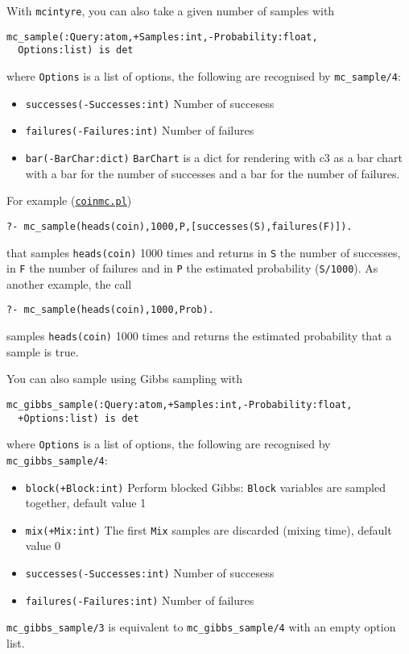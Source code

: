 With \verb|mcintyre|, you can also take a given number of samples with
\begin{verbatim}
mc_sample(:Query:atom,+Samples:int,-Probability:float,
  Options:list) is det
\end{verbatim}
where
\verb|Options| is a list of options, the following are recognised by \verb|mc_sample/4|:
\begin{itemize}
\item \verb|successes(-Successes:int)|
Number of succesess
\item \verb|failures(-Failures:int)|
Number of failures
\item \verb|bar(-BarChar:dict)|
\verb|BarChart| is a dict for rendering with c3 as a bar chart with
a bar for the number of successes and a bar for the number
of failures.
\end{itemize}
For example (\href{http://cplint.eu/example/inference/coinmc.pl}{\texttt{coinmc.pl}})
\begin{verbatim}
?- mc_sample(heads(coin),1000,P,[successes(S),failures(F)]).
\end{verbatim}
that samples \verb|heads(coin)| 1000 times and returns in \verb|S| the number of successes, in \verb|F| the number of failures and in \verb|P| the
estimated probability (\verb|S/1000|).
As another example, the call
\begin{verbatim}
?- mc_sample(heads(coin),1000,Prob).
\end{verbatim}
samples \verb|heads(coin)| 1000 times and returns the
estimated probability that a sample is true.

You can also sample using Gibbs sampling with
\begin{verbatim}
mc_gibbs_sample(:Query:atom,+Samples:int,-Probability:float,
  +Options:list) is det
\end{verbatim}
where
\verb|Options| is a list of options, the following are recognised by \verb|mc_gibbs_sample/4|:
\begin{itemize}
\item \verb|block(+Block:int)|
   Perform blocked Gibbs: \verb|Block| variables are sampled together, default value 1
\item \verb|mix(+Mix:int)|
   The first \verb|Mix| samples are discarded (mixing time), default value 0
\item \verb|successes(-Successes:int)|
Number of succesess
\item \verb|failures(-Failures:int)|
Number of failures
\end{itemize}
\verb|mc_gibbs_sample/3| is equivalent to \verb|mc_gibbs_sample/4| with an empty option list.

